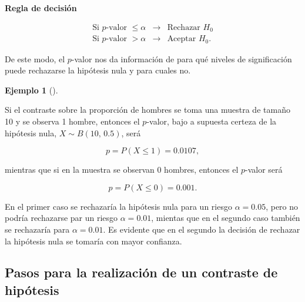 \documentclass[
  spanish,
  a4paper,
]{scrreport}
\theoremstyle{plain}
\theoremstyle{definition}
\newtheorem{example}{Ejemplo}[chapter]
\theoremstyle{definition}
\theoremstyle{remark}
\begin{document}
\begin{tcolorbox}[enhanced jigsaw, arc=.35mm, bottomrule=.15mm, bottomtitle=1mm, breakable, colback=white, colbacktitle=quarto-callout-note-color!10!white, colframe=quarto-callout-note-color-frame, coltitle=black, left=2mm, leftrule=.75mm, opacityback=0, opacitybacktitle=0.6, rightrule=.15mm, title=\textcolor{quarto-callout-note-color}{\faInfo}\hspace{0.5em}{Interpretación}, titlerule=0mm, toprule=.15mm, toptitle=1mm]

\textbf{Regla de decisión}

\[
\begin{array}{ccc}
\mbox{Si $p$-valor $\leq \alpha$} & \rightarrow & \mbox{Rechazar $H_0$} \\
\mbox{Si $p$-valor $> \alpha$} & \rightarrow & \mbox{Aceptar $H_0$}.
\end{array}
\]

\end{tcolorbox}

De este modo, el \(p\)-valor nos da información de para qué niveles de
significación puede rechazarse la hipótesis nula y para cuales no.

\begin{example}[]\protect\hypertarget{exm-p-valor}{}\label{exm-p-valor}

Si el contraste sobre la proporción de hombres se toma una muestra de
tamaño 10 y se observa 1 hombre, entonces el \(p\)-valor, bajo a
supuesta certeza de la hipótesis nula, \(X\sim B(10,\, 0.5)\), será

\[p = P(X\leq 1)= 0.0107,\]

mientras que si en la muestra se observan 0 hombres, entonces el
\(p\)-valor será

\[p = P(X\leq 0)= 0.001.\]

En el primer caso se rechazaría la hipótesis nula para un riesgo
\(\alpha=0.05\), pero no podría rechazarse par un riesgo
\(\alpha=0.01\), mientas que en el segundo caso también se rechazaría
para \(\alpha=0.01\). Es evidente que en el segundo la decisión de
rechazar la hipótesis nula se tomaría con mayor confianza.

\end{example}

\subsection{Pasos para la realización de un contraste de
hipótesis}\label{pasos-para-la-realizaciuxf3n-de-un-contraste-de-hipuxf3tesis}
\end{document}
